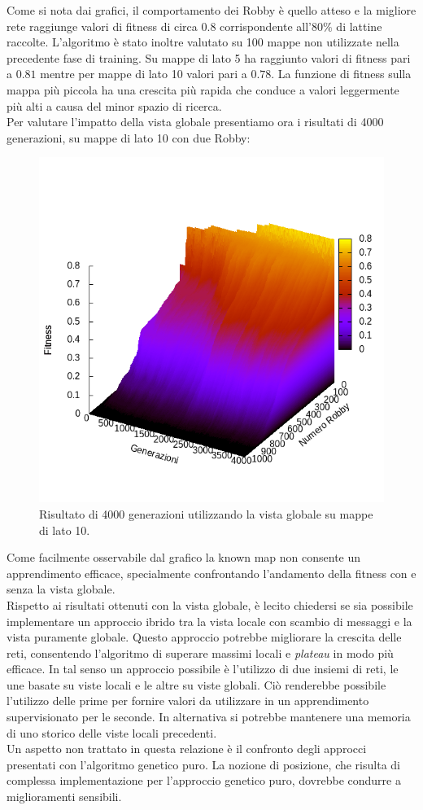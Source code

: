 Come si nota dai grafici, il comportamento dei Robby è quello atteso e la
migliore rete raggiunge valori di fitness di circa $0.8$ corrispondente
all'$80\%$ di lattine raccolte. L'algoritmo è stato inoltre valutato su 100 mappe
non utilizzate nella precedente fase di training. Su mappe di lato 5 ha
raggiunto valori di fitness pari a $0.81$ mentre per mappe di lato 10 valori
pari a $0.78$.  La funzione di fitness sulla mappa più piccola
ha una crescita più rapida che conduce a valori leggermente più alti a causa
del minor spazio di ricerca.\\

Per valutare l'impatto della vista globale presentiamo ora i risultati di 4000
generazioni, su mappe di lato 10 con due Robby:

\begin{figure}[H]
\centering
	\centering
	\includegraphics[width=.75\textwidth]{img/graph10x10.png}
\caption{Risultato di 4000 generazioni utilizzando la vista globale su mappe di lato 10.}
\end{figure}

Come facilmente osservabile dal grafico la known map non consente un
apprendimento efficace, specialmente confrontando l'andamento della fitness con
e senza la vista globale.\\

Rispetto ai risultati ottenuti con la vista globale, è lecito chiedersi se sia
possibile implementare un approccio ibrido tra la vista locale con scambio di
messaggi e la vista puramente globale. Questo approccio potrebbe migliorare la
crescita delle reti, consentendo l'algoritmo di superare massimi locali e
\emph{plateau} in modo più efficace. In tal senso un approccio possibile è
l'utilizzo di due insiemi di reti, le une basate su viste locali e le altre su
viste globali. Ciò renderebbe possibile l'utilizzo delle prime per fornire
valori da utilizzare in un apprendimento supervisionato per le seconde. In
alternativa si potrebbe mantenere una memoria di uno storico delle viste locali
precedenti.\\

Un aspetto non trattato in questa relazione è il confronto degli approcci
presentati con l'algoritmo genetico puro. La nozione di posizione, che
risulta di complessa implementazione per l'approccio genetico puro, dovrebbe
condurre a miglioramenti sensibili.
